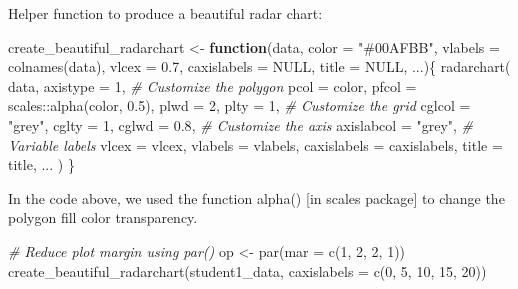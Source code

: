 \documentclass[
]{article}
\newenvironment{Shaded}{\begin{snugshade}}{\end{snugshade}}
\newcommand{\AttributeTok}[1]{\textcolor[rgb]{0.77,0.63,0.00}{#1}}
\newcommand{\CommentTok}[1]{\textcolor[rgb]{0.56,0.35,0.01}{\textit{#1}}}
\newcommand{\ConstantTok}[1]{\textcolor[rgb]{0.00,0.00,0.00}{#1}}
\newcommand{\ControlFlowTok}[1]{\textcolor[rgb]{0.13,0.29,0.53}{\textbf{#1}}}
\newcommand{\DecValTok}[1]{\textcolor[rgb]{0.00,0.00,0.81}{#1}}
\newcommand{\FloatTok}[1]{\textcolor[rgb]{0.00,0.00,0.81}{#1}}
\newcommand{\FunctionTok}[1]{\textcolor[rgb]{0.00,0.00,0.00}{#1}}
\newcommand{\NormalTok}[1]{#1}
\newcommand{\OtherTok}[1]{\textcolor[rgb]{0.56,0.35,0.01}{#1}}
\newcommand{\SpecialCharTok}[1]{\textcolor[rgb]{0.00,0.00,0.00}{#1}}
\newcommand{\StringTok}[1]{\textcolor[rgb]{0.31,0.60,0.02}{#1}}
\begin{document}
Helper function to produce a beautiful radar chart:

\begin{Shaded}
\begin{Highlighting}[]
\NormalTok{create\_beautiful\_radarchart }\OtherTok{\textless{}{-}} \ControlFlowTok{function}\NormalTok{(data, }\AttributeTok{color =} \StringTok{"\#00AFBB"}\NormalTok{, }
                                        \AttributeTok{vlabels =} \FunctionTok{colnames}\NormalTok{(data), }\AttributeTok{vlcex =} \FloatTok{0.7}\NormalTok{,}
                                        \AttributeTok{caxislabels =} \ConstantTok{NULL}\NormalTok{, }\AttributeTok{title =} \ConstantTok{NULL}\NormalTok{, ...)\{}
  \FunctionTok{radarchart}\NormalTok{(}
\NormalTok{    data, }\AttributeTok{axistype =} \DecValTok{1}\NormalTok{,}
    \CommentTok{\# Customize the polygon}
    \AttributeTok{pcol =}\NormalTok{ color, }\AttributeTok{pfcol =}\NormalTok{ scales}\SpecialCharTok{::}\FunctionTok{alpha}\NormalTok{(color, }\FloatTok{0.5}\NormalTok{), }\AttributeTok{plwd =} \DecValTok{2}\NormalTok{, }\AttributeTok{plty =} \DecValTok{1}\NormalTok{,}
    \CommentTok{\# Customize the grid}
    \AttributeTok{cglcol =} \StringTok{"grey"}\NormalTok{, }\AttributeTok{cglty =} \DecValTok{1}\NormalTok{, }\AttributeTok{cglwd =} \FloatTok{0.8}\NormalTok{,}
    \CommentTok{\# Customize the axis}
    \AttributeTok{axislabcol =} \StringTok{"grey"}\NormalTok{, }
    \CommentTok{\# Variable labels}
    \AttributeTok{vlcex =}\NormalTok{ vlcex, }\AttributeTok{vlabels =}\NormalTok{ vlabels,}
    \AttributeTok{caxislabels =}\NormalTok{ caxislabels, }\AttributeTok{title =}\NormalTok{ title, ...}
\NormalTok{  )}
\NormalTok{\}}
\end{Highlighting}
\end{Shaded}

In the code above, we used the function alpha() {[}in scales package{]}
to change the polygon fill color transparency.

\begin{Shaded}
\begin{Highlighting}[]
\CommentTok{\# Reduce plot margin using par()}
\NormalTok{op }\OtherTok{\textless{}{-}} \FunctionTok{par}\NormalTok{(}\AttributeTok{mar =} \FunctionTok{c}\NormalTok{(}\DecValTok{1}\NormalTok{, }\DecValTok{2}\NormalTok{, }\DecValTok{2}\NormalTok{, }\DecValTok{1}\NormalTok{))}
\FunctionTok{create\_beautiful\_radarchart}\NormalTok{(student1\_data, }\AttributeTok{caxislabels =} \FunctionTok{c}\NormalTok{(}\DecValTok{0}\NormalTok{, }\DecValTok{5}\NormalTok{, }\DecValTok{10}\NormalTok{, }\DecValTok{15}\NormalTok{, }\DecValTok{20}\NormalTok{))}
\end{Highlighting}
\end{Shaded}
\end{document}

